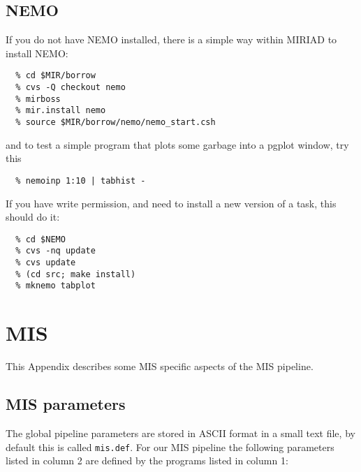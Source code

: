 \documentclass[preprint]{aastex} %
\begin{document}
\section{NEMO}

If you do not have NEMO installed, there is a simple way within
MIRIAD to install NEMO:

\footnotesize
\begin{verbatim}
  % cd $MIR/borrow
  % cvs -Q checkout nemo
  % mirboss
  % mir.install nemo
  % source $MIR/borrow/nemo/nemo_start.csh
\end{verbatim}
\normalsize

and to test a simple program that plots some garbage into a pgplot window, try this

\footnotesize
\begin{verbatim}
  % nemoinp 1:10 | tabhist -
\end{verbatim}
\normalsize

If you have write permission, and need to install a new version of a task, this
should do it:

\footnotesize
\begin{verbatim}
  % cd $NEMO
  % cvs -nq update
  % cvs update
  % (cd src; make install)
  % mknemo tabplot
\end{verbatim}
\normalsize


\chapter{MIS}

This Appendix describes some MIS specific aspects of the MIS pipeline.

\section{MIS parameters}

The global pipeline parameters are stored in ASCII format in
a small text file, by default this is called {\tt mis.def}. 
For our MIS pipeline the following
parameters listed in column 2 are
defined by the programs listed in column 1:
\end{document}
